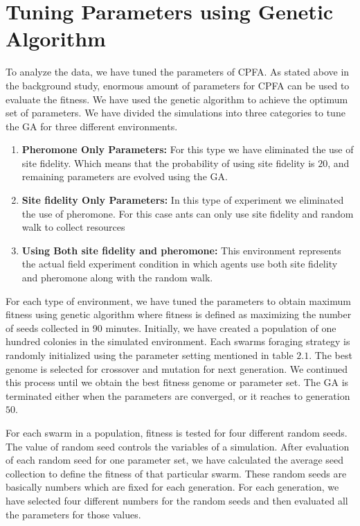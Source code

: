 \section{\label{section:Tuning Parameters using Genetic Algorithm}Tuning Parameters using Genetic Algorithm}
   To analyze the data, we have tuned the parameters of CPFA. As stated above in the background study, enormous amount of parameters for CPFA can be used to evaluate the fitness. We have used the genetic algorithm to achieve the optimum set of parameters. We have divided the simulations into three categories to tune the GA for three different environments. 
   \begin{enumerate}
   	\item \textbf{Pheromone Only Parameters:}  For this type we have eliminated the use of site fidelity. Which means that the probability of using site fidelity is $20$, and remaining parameters are evolved using the GA. 
   	\item \textbf{Site fidelity Only Parameters:} In this type of experiment we eliminated the use of pheromone. For this case ants can only use site fidelity and random walk to collect resources
   	\item \textbf{Using Both site fidelity and pheromone:} This environment represents the actual field experiment condition in which agents use both site fidelity and pheromone along with the random walk.    	
   \end{enumerate}
For each type of environment, we have tuned the parameters to obtain maximum fitness using genetic algorithm where fitness is defined as maximizing the number of seeds collected in 90 minutes. Initially, we have created a population of one hundred colonies in the simulated environment. Each swarm\textquotesingle s foraging strategy is randomly initialized using the parameter setting mentioned in table $2.1$. The best genome is selected for crossover and mutation for next generation. We continued this process until we obtain the best fitness genome or parameter set. The GA is terminated either when the parameters are converged, or it reaches to generation $50$.\par  
For each swarm in a population, fitness is tested for four different random seeds. The value of random seed controls the variables of a simulation. After evaluation of each random seed for one parameter set, we have calculated the average seed collection to define the fitness of that particular swarm. These random seeds are basically numbers which are fixed for each generation. For each generation, we have selected four different numbers for the random seeds and then evaluated all the parameters for those values.\par  
